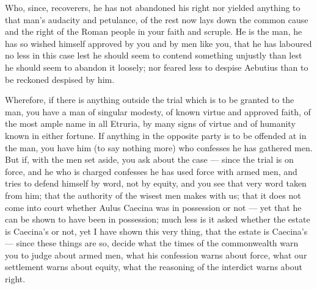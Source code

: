  Who, since, recoverers, he has not abandoned his right nor yielded anything to that man's audacity and petulance, of the rest now lays down the common cause and the right of the Roman people in your faith and scruple. He is the man, he has so wished himself approved by you and by men like you, that he has laboured no less in this case lest he should seem to contend something unjustly than lest he should seem to abandon it loosely; nor feared less to despise Aebutius than to be reckoned despised by him.

 Wherefore, if there is anything outside the trial which is to be granted to the man, you have a man of singular modesty, of known virtue and approved faith, of the most ample name in all Etruria, by many signs of virtue and of humanity known in either fortune. If anything in the opposite party is to be offended at in the man, you have him (to say nothing more) who confesses he has gathered men. But if, with the men set aside, you ask about the case --- since the trial is on force, and he who is charged confesses he has used force with armed men, and tries to defend himself by word, not by equity, and you see that very word taken from him; that the authority of the wisest men makes with us; that it does not come into court whether Aulus Caecina was in possession or not --- yet that he can be shown to have been in possession; much less is it asked whether the estate is Caecina's or not, yet I have shown this very thing, that the estate is Caecina's --- since these things are so, decide what the times of the commonwealth warn you to judge about armed men, what his confession warns about force, what our settlement warns about equity, what the reasoning of the interdict warns about right.

